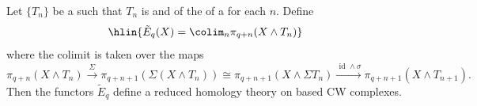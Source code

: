 \begin{theorem}{\cite[Theorem Chapter 22 Page 176]{may}} \label{theorem:reduced_homology_theory_on_pointed_CW_complexes_defined_by_homotopy_groups_of_smash_product_with_a_prespectrum}
    Let $\{T_n\}$ be a  such that $T_n$ is  and of the  of a  for each $n$. Define
    $$\hlin{\tilde{E}_q(X) = \colim_n \pi_{q+n}(X \wedge T_n)}$$
    where the colimit is taken over the maps 
    $$ \pi_{q+n}\left(X \wedge T_{n}\right) \stackrel{\Sigma}{\rightarrow} \pi_{q+n+1}\left(\Sigma\left(X \wedge T_{n}\right)\right) \cong \pi_{q+n+1}\left(X \wedge \Sigma T_{n}\right) \stackrel{\text { id } \wedge \sigma}{\longrightarrow} \pi_{q+n+1}\left(X \wedge T_{n+1}\right).$$
    Then the functors $\tilde{E}_q$ define a reduced homology theory on based CW complexes.
\end{theorem}